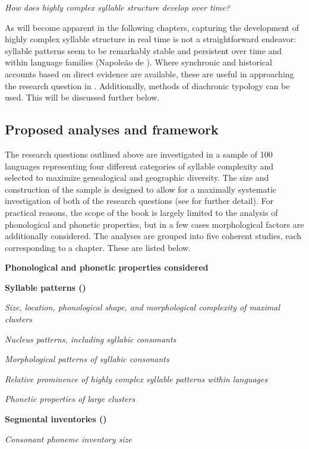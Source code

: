 \ea\label{ex:1.24}
   \textit{How does highly complex syllable structure develop over time?}
\z

  As will become apparent in the following chapters, capturing the development of highly complex syllable structure in real time is not a straightforward endeavor: syllable patterns seem to be remarkably stable and persistent over time and within language families (Napoleão de \citealt{Souza2017}). Where synchronic and historical accounts based on direct evidence are available, these are useful in approaching the research question in . Additionally, methods of diachronic typology can be used. This will be discussed further below.

\subsection{Proposed analyses and framework}\label{sec:1.4.2}

  The research questions outlined above are investigated in a sample of 100 languages representing four different categories of syllable complexity and selected to maximize genealogical and geographic diversity. The size and construction of the sample is designed to allow for a maximally systematic investigation of both of the research questions (see  for further detail). For practical reasons, the scope of the book is largely limited to the analysis of phonological and phonetic properties, but in a few cases morphological factors are additionally considered. The analyses are grouped into five coherent studies, each corresponding to a chapter. These are listed below.

\ea\label{ex:1.25}
  \textbf{Phonological and phonetic properties considered}

\textbf{Syllable patterns ()}

\textit{Size, location, phonological shape, and morphological complexity of maximal clusters}

\textit{Nucleus patterns, including syllabic consonants}

\textit{Morphological patterns of syllabic consonants}

\textit{Relative prominence of highly complex syllable patterns within languages}

\textit{Phonetic properties of large clusters}

\textbf{Segmental inventories ()}

\textit{Consonant phoneme inventory size}

